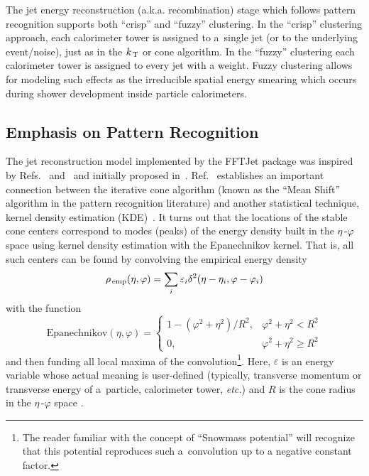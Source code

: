 \documentclass[epsf,12pt,titlepage]{article}
\newcommand{\sub}[1]{\ensuremath{_{\mbox{\scriptsize \,#1}}}}
\def\KT {\mbox{$k\sub{T}$} }
\def\epspace {$\eta$\,-$\varphi$ space }
\begin{document}
The jet energy reconstruction (a.k.a. recombination) stage which follows
pattern recognition supports both ``crisp'' and ``fuzzy'' clustering.
In the ``crisp'' clustering approach, each
calorimeter tower is assigned to a~single jet
(or to the underlying event/noise), just as in the \KT or cone algorithm.
In the ``fuzzy'' clustering each calorimeter tower
is assigned to every jet with a weight. Fuzzy clustering allows for modeling
such effects as the irreducible spatial energy smearing which occurs during
shower development inside particle calorimeters. 


\subsection{Emphasis on Pattern Recognition}

The jet reconstruction model implemented by the FFTJet package
was inspired by Refs.~\cite{ref:cheng} and~\cite{ref:modetree}
and initially proposed in~\cite{ref:igv2006}.
Ref.~\cite{ref:cheng} establishes an important connection
between the iterative cone algorithm (known as the ``Mean Shift''
algorithm in the pattern recognition literature) and
another statistical technique, kernel density estimation
(KDE)~\cite{ref:kde}. It turns out that
the locations of the stable cone centers correspond to
modes (peaks) of the energy
density built in the \epspace using kernel density
estimation with the Epanechnikov kernel. That is, all
such centers can be found by convolving the empirical energy density
$$
\rho\sub{emp}(\eta, \varphi) = \sum_{i} \varepsilon_{i} \delta^{2} (\eta - \eta_{i}, \varphi - \varphi_{i})
$$
with the function
$$
\mbox{Epanechnikov}(\eta, \varphi) = \left\{ \begin{array}{ll}
                           1 - (\varphi^2 + \eta^2)/R^2, & \varphi^2 + \eta^2 < R^2\\
                           0, & \varphi^2 + \eta^2 \ge R^2
                           \end{array}
                       \right.
$$
and then funding all local maxima of the convolution\footnote{The reader
familiar with the concept of ``Snowmass potential'' will recognize 
that this potential reproduces such
a~convolution up to a negative constant factor.}.
Here, $\varepsilon$ is an energy
variable whose actual meaning is user-defined (typically, transverse momentum
or transverse energy of a~particle, calorimeter tower, {\it etc.}) and $R$
is the cone radius in the \epspace$\!\!$.
\end{document}
